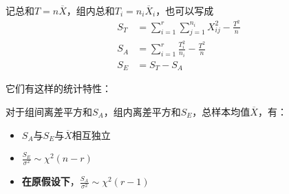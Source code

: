 记总和$T=n\overline{X}$，组内总和$T_i=n_i\overline{X}_i$，也可以写成
\begin{align*}
S_T &= \sum_{i=1}^r \sum_{j=1}^{n_i} X_{ij}^2 - \frac{T^2}{n}\\
S_A &= \sum_{i=1}^r \frac{T_i^2}{n_i} -\frac{T^2}{n}\\
S_E &= S_T-S_A
\end{align*}

它们有这样的统计特性：
\begin{theorem}
对于组间离差平方和$S_A$，组内离差平方和$S_E$，总样本均值$\overline{X}$，有：

\begin{itemize}
    \item $S_A$与$S_E$与$\overline{X}$相互独立
    \item $\frac{S_E}{\sigma^2}\sim \chi^2(n-r)$
    \item \textbf{在原假设下}，$\frac{S_A}{\sigma^2}\sim \chi^2(r-1)$
\end{itemize}
\end{theorem}

